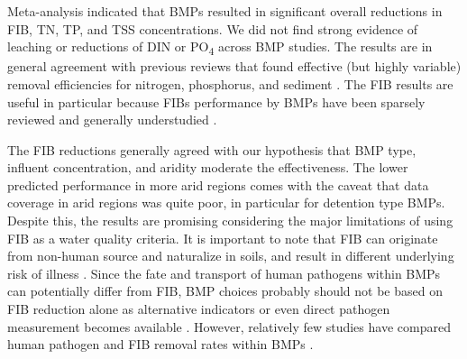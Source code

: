 \documentclass[utf8]{FrontiersinHarvard}
\begin{document}
Meta-analysis indicated that BMPs resulted in significant overall reductions in FIB, TN, TP, and TSS concentrations.
We did not find strong evidence of leaching or reductions of DIN or PO\textsubscript{4} across BMP studies.
The results are in general agreement with previous reviews that found effective (but highly variable) removal efficiencies for nitrogen, phosphorus, and sediment \citep{claryBMPPerformanceAnalysis2011, kochNitrogenRemovalStormwater2014, liuReviewEffectivenessBest2017}.
The FIB results are useful in particular because FIBs performance by BMPs have been sparsely reviewed and generally understudied \citep{hagerPerformanceLowimpactDevelopment2019}.

The FIB reductions generally agreed with our hypothesis that BMP type, influent concentration, and aridity moderate the effectiveness.
The lower predicted performance in more arid regions comes with the caveat that data coverage in arid regions was quite poor, in particular for detention type BMPs.
Despite this, the results are promising considering the major limitations of using FIB as a water quality criteria.
It is important to note that FIB can originate from non-human source and naturalize in soils, and result in different underlying risk of illness \citep{ishiiEscherichiaColiEnvironment2008, schoenAssessingPathogenRisk2010, sollerEstimatedHumanHealth2010, fujiokaRecreationalWaterQuality2015}.
Since the fate and transport of human pathogens within BMPs can potentially differ from FIB, BMP choices probably should not be based on FIB reduction alone as alternative indicators or even direct pathogen measurement becomes available \citep{pengIndicatorPathogenRemoval2016, waltersPersistenceNucleicAcid2009}.
However, relatively few studies have compared human pathogen and FIB removal rates within BMPs \citep{rughHighlyVariableRemoval2022}.
\end{document}
